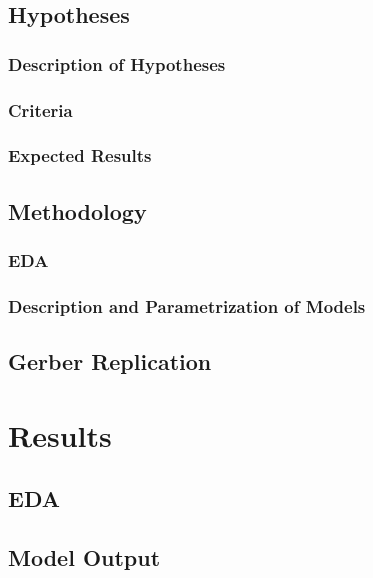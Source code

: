 \documentclass[12pt,twoside]{reedthesis}
\begin{document}
  \section{Hypotheses}\label{hypotheses}
  
  \subsection{Description of Hypotheses}\label{description-of-hypotheses}
  
  \subsection{Criteria}\label{criteria}
  
  \subsection{Expected Results}\label{expected-results}
  
  \section{Methodology}\label{methodology}
  
  \subsection{EDA}\label{eda}
  
  \subsection{Description and Parametrization of
  Models}\label{description-and-parametrization-of-models}
  
  \section{Gerber Replication}\label{gerber-replication}
  
  \chapter{Results}\label{results}
  
  \section{EDA}\label{eda-1}
  
  \section{Model Output}\label{model-output}
  
\end{document}
